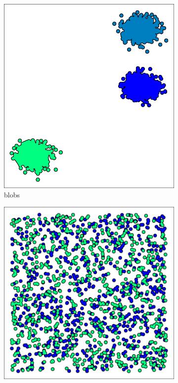 \begin{figure}%
\centering	
	\begin{subfigure}[b]{0.22\textwidth}
		\centering
		\includegraphics[height=\textwidth]{pix/blobs_color_3600.pdf}
		\caption{blobs}
	\end{subfigure}
	\hspace*{0.01\textwidth}	
	\begin{subfigure}[b]{0.22\textwidth}
		\centering
		\includegraphics[height=\textwidth]{pix/random_color_3600.pdf}

\end{subfigure}
\end{figure}
